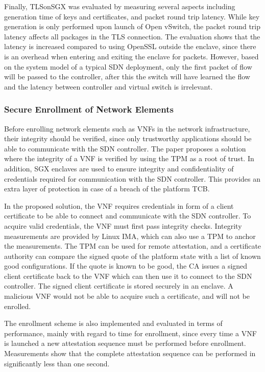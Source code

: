 Finally, TLSonSGX was evaluated by measuring several aspects including generation time of keys and certificates, and packet round trip latency.
While key generation is only performed upon launch of Open vSwitch, the packet round trip latency affects all packages in the TLS connection.
The evaluation shows that the latency is increased compared to using OpenSSL outside the enclave, since there is an overhead when entering and exiting the enclave for packets.
However, based on the system model of a typical SDN deployment, only the first packet of flow will be passed to the controller, after this the switch will have learned the flow and the latency between controller and virtual switch is irrelevant.

\subsubsection{Secure Enrollment of Network Elements}

Before enrolling network elements such as VNFs in the network infrastructure, their integrity should be verified, since only trustworthy applications should be able to communicate with the SDN controller.
The paper proposes a solution where the integrity of a VNF is verified by using the TPM as a root of trust.
In addition, SGX enclaves are used to ensure integrity and confidentiality of credentials required for communication with the SDN controller.
This provides an extra layer of protection in case of a breach of the platform TCB.

In the proposed solution, the VNF requires credentials in form of a client certificate to be able to connect and communicate with the SDN controller.
To acquire valid credentials, the VNF must first pass integrity checks.
Integrity measurements are provided by Linux IMA, which can also use a TPM to anchor the measurements.
The TPM can be used for remote attestation, and a certificate authority can compare the signed quote of the platform state with a list of known good configurations.
If the quote is known to be good, the CA issues a signed client certificate back to the VNF which can then use it to connect to the SDN controller.
The signed client certificate is stored securely in an enclave.
A malicious VNF would not be able to acquire such a certificate, and will not be enrolled.

The enrollment scheme is also implemented and evaluated in terms of performance, mainly with regard to time for enrollment, since every time a VNF is launched a new attestation sequence must be performed before enrollment.
Measurements show that the complete attestation sequence can be performed in significantly less than one second.

